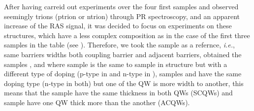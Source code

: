 
After having carreid out experiments over the four first samples and observed seemingly trions (\gls{ptrion} or \gls{ntrion}) through \gls{PR} spectroscopy, and an apparent increase of the \gls{RAS} signal, it was decided
to focus on experiments on these structures, which have a less complex composition as
in the case of the first three samples in the table (see ). Therefore, we took the sample  as a refernce, \textit{i.e.}, same barriers widths both coupling barrier and adjacent
barriers, obtained the samples ,  and  where sample 
is the same to sample  in structure but with a different type of doping (p-type in
 and n-type in ), samples  and  have the same doping
type (n-type in both) but one of the QW is more width to another, this means that the
sample  have the same thickness in both QWs (SCQWs) and sample 
have one \gls{QW} thick more than the another (\gls{ACQWs}).

